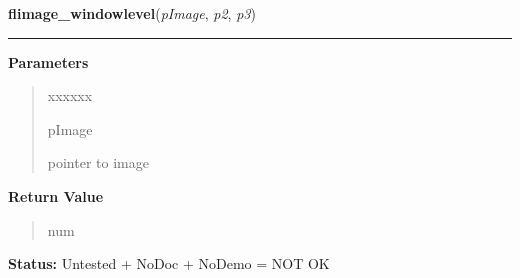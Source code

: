 \hspace{.8\funcindent}\begin{boxedminipage}{\funcwidth}

    \raggedright \textbf{flimage\_windowlevel}(\textit{pImage}, \textit{p2}, \textit{p3})

    \vspace{-1.5ex}

    \rule{\textwidth}{0.5\fboxrule}
\setlength{\parskip}{2ex}
\setlength{\parskip}{1ex}
      \textbf{Parameters}
      \vspace{-1ex}

      \begin{quote}
        \begin{Ventry}{xxxxxx}

          \item[pImage]

          pointer to image

        \end{Ventry}

      \end{quote}

      \textbf{Return Value}
    \vspace{-1ex}

      \begin{quote}
      num

      \end{quote}

\textbf{Status:} Untested + NoDoc + NoDemo = NOT OK



    \end{boxedminipage}

    \label{xformslib:library:flimage_enhance}

    \vspace{0.5ex}

